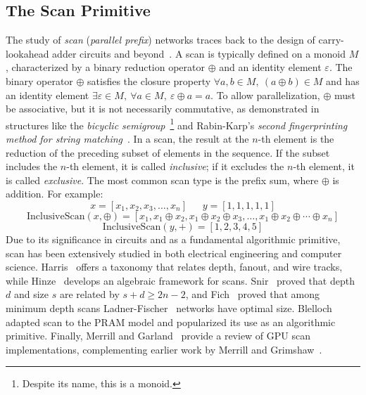 \documentclass[sigconf]{acmart}
\begin{document}
\subsection{The Scan Primitive}\label{sec:the-scan-primitive}
The study of \emph{scan} (\emph{parallel prefix}) networks traces back to the design of carry-lookahead adder circuits and beyond~\cite{5219801,10.5555/1098666}. A scan is typically defined on a monoid \( M \), characterized by a binary reduction operator \( \oplus \) and an identity element \( \varepsilon \). The binary operator \( \oplus \) satisfies the closure property \( \forall a, b \in M, \ (a \oplus b) \in M \) and has an identity element \( \exists \varepsilon \in M, \ \forall a \in M, \ \varepsilon \oplus a = a \). To allow parallelization, \( \oplus \) must be associative, but it is not necessarily commutative, as demonstrated in structures like the \emph{bicyclic semigroup}~\cite{}\footnote{Despite its name, this is a monoid.} and Rabin-Karp's \emph{second fingerprinting method for string matching}~\cite[Section 6]{Karp:1987:ERP}. In a scan, the result at the \( n \)-th element is the reduction of the preceding subset of elements in the sequence. If the subset includes the \( n \)-th element, it is called \emph{inclusive}; if it excludes the \( n \)-th element, it is called \emph{exclusive}. The most common scan type is the prefix sum, where \( \oplus \) is addition. For example:
\[
  x = [x_1, x_2, x_3, \dots, x_n] \ \ \ \ \ \ \ y = [1, 1, 1, 1, 1]
\]
\[
  \text{InclusiveScan}(x, \oplus) = [x_1, x_1 \oplus x_2, x_1 \oplus x_2 \oplus x_3, \dots, x_1 \oplus x_2 \oplus \cdots \oplus x_n]
\]
\[
  \text{InclusiveScan}(y, +) = [1, 2, 3, 4, 5]
\]
Due to its significance in circuits and as a fundamental algorithmic primitive, scan has been extensively studied in both electrical engineering and computer science. Harris~\cite{1292373} offers a taxonomy that relates depth, fanout, and wire tracks, while Hinze~\cite{10.1007/978-3-540-27764-4_11} develops an algebraic framework for scans. Snir~\cite{10.1016/0196-67748690003-9} proved that depth $d$ and size $s$ are related by $s + d \ge 2n - 2$, and Fich~\cite{10.1145/800061.808738} proved that among minimum depth scans Ladner-Fischer~\cite{10.1145/322217.322232} networks have optimal size. Blelloch~\cite{Blelloch:1989:SAP} adapted scan to the PRAM model and popularized its use as an algorithmic primitive. Finally, Merrill and Garland~\cite{Merrill2016} provide a review of GPU scan implementations, complementing earlier work by Merrill and Grimshaw~\cite{Merrill2009}.
\end{document}
